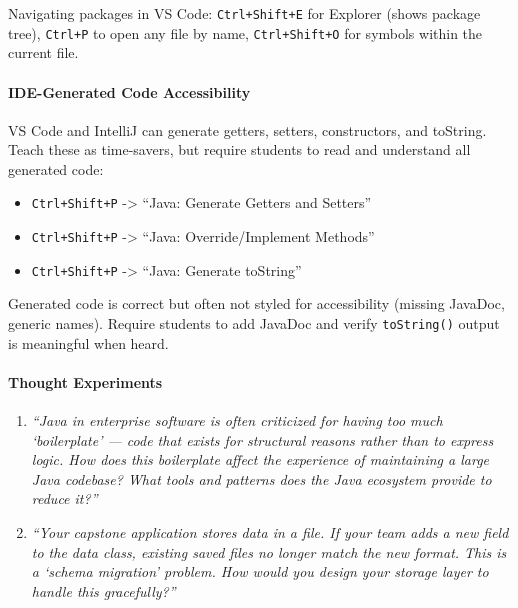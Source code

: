 \documentclass[
  justified,
  openright,
]{tufte-book}
\let\subsection\paragraph
\let\paragraph\paragraph
\let\subsection\paragraph
\let\paragraph\paragraph
\providecommand{\tightlist}{%
  \setlength{\itemsep}{0pt}\setlength{\parskip}{0pt}}
\begin{document}
Navigating packages in VS Code: \texttt{Ctrl+Shift+E} for Explorer
(shows package tree), \texttt{Ctrl+P} to open any file by name,
\texttt{Ctrl+Shift+O} for symbols within the current file.

\subsection{IDE-Generated Code
Accessibility}\label{ide-generated-code-accessibility}

VS Code and IntelliJ can generate getters, setters, constructors, and
toString. Teach these as time-savers, but require students to read and
understand all generated code:

\begin{itemize}
\tightlist
\item
  \texttt{Ctrl+Shift+P} -\textgreater{} ``Java: Generate Getters and
  Setters''
\item
  \texttt{Ctrl+Shift+P} -\textgreater{} ``Java: Override/Implement
  Methods''
\item
  \texttt{Ctrl+Shift+P} -\textgreater{} ``Java: Generate toString''
\end{itemize}

Generated code is correct but often not styled for accessibility
(missing JavaDoc, generic names). Require students to add JavaDoc and
verify \texttt{toString()} output is meaningful when heard.

\paragraph{Thought Experiments}\label{thought-experiments-42}

\begin{enumerate}
\def\labelenumi{\arabic{enumi}.}
\item
  \emph{``Java in enterprise software is often criticized for having too
  much `boilerplate' --- code that exists for structural reasons rather
  than to express logic. How does this boilerplate affect the experience
  of maintaining a large Java codebase? What tools and patterns does the
  Java ecosystem provide to reduce it?''}
\item
  \emph{``Your capstone application stores data in a file. If your team
  adds a new field to the data class, existing saved files no longer
  match the new format. This is a `schema migration' problem. How would
  you design your storage layer to handle this gracefully?''}
\end{enumerate}
\end{document}
